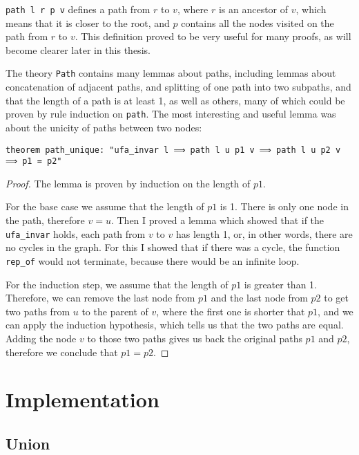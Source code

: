 \lstinline{path l r p v} defines a path from $r$ to $v$, where $r$ is an ancestor of $v$, which means that it is closer to the root, and $p$ contains all the nodes visited on the path from $r$ to $v$. This definition proved to be very useful for many proofs, as will become clearer later in this thesis.

The theory \lstinline{Path} contains many lemmas about paths, including lemmas about concatenation of adjacent paths, and splitting of one path into two subpaths, and that the length of a path is at least 1, as well as others, many of which could be proven by rule induction on \lstinline{path}. The most interesting and useful lemma was about the unicity of paths between two nodes:

\begin{lstlisting}
theorem path_unique: "ufa_invar l ⟹ path l u p1 v ⟹ path l u p2 v ⟹ p1 = p2"
\end{lstlisting}

\begin{proof}
The lemma is proven by induction on the length of $p1$.

For the base case we assume that the length of $p1$ is 1. There is only one node in the path, therefore $v = u$. Then I proved a lemma which showed that if the \lstinline{ufa_invar} holds, each path from $v$ to $v$ has length 1, or, in other words, there are no cycles in the graph. For this I showed that if there was a cycle, the function \lstinline{rep_of} would not terminate, because there would be an infinite loop.

For the induction step, we assume that the length of $p1$ is greater than 1. Therefore, we can remove the last node from $p1$ and the last node from $p2$ to get two paths from $u$ to the parent of $v$, where the first one is shorter that $p1$, and we can apply the induction hypothesis, which tells us that the two paths are equal. Adding the node $v$ to those two paths gives us back the original paths $p1$ and $p2$, therefore we conclude that $p1 = p2$.
\end{proof}

\section{Implementation}

\subsection{Union}

